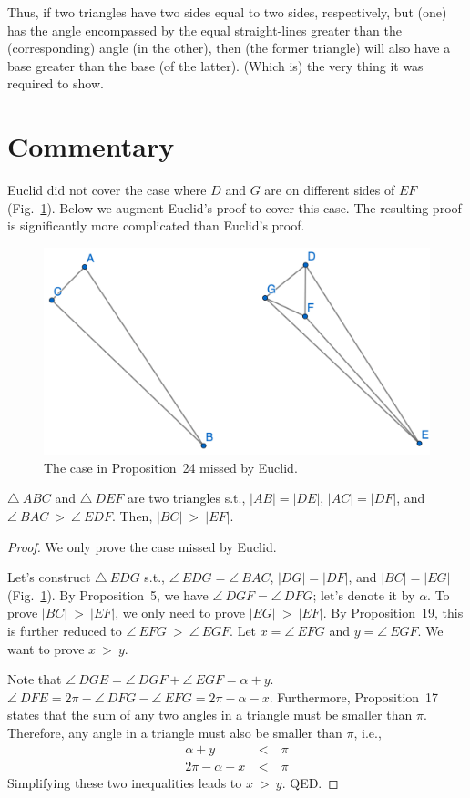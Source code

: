 Thus, if two triangles have two sides equal to two sides, respectively,
but (one) has the angle encompassed by the equal straight-lines greater than the 
(corresponding) angle (in the other), then (the former triangle) will also have a base greater than the base (of the latter).
(Which is) the very thing it was required to show.


\section*{Commentary}

Euclid did not cover the case where $D$ and $G$ are on different sides of $EF$ (Fig.~\ref{fig:prop_24b}). Below we augment Euclid's proof to cover this case. The resulting proof is significantly more complicated than Euclid's proof.

\begin{figure}[ht]
    \begin{center}
    \includegraphics[width=0.35\linewidth]{figures/proposition_24.png}
    \caption{The case in Proposition~24 missed by Euclid.}
    \label{fig:prop_24b}
    \end{center}
\end{figure}


\begin{proposition}\label{proposition_24}\leanok
    $\triangle~ABC$ and $\triangle~DEF$ are two triangles s.t., $|AB|=|DE|$, $|AC|=|DF|$, and $\angle~BAC~>~\angle~EDF$. Then, $|BC|~>~|EF|$.
\end{proposition}
\begin{proof}
    \leanok
    We only prove the case missed by Euclid. 
    
    Let's construct $\triangle~EDG$ s.t., $\angle~EDG = \angle~BAC$, $|DG|=|DF|$, and $|BC|=|EG|$ (Fig.~\ref{fig:prop_24b}). By Proposition~5, we have $\angle~DGF = \angle~DFG$; let's denote it by $\alpha$. To prove $|BC|~>~|EF|$, we only need to prove $|EG|~>~|EF|$. By Proposition~19, this is further reduced to $\angle~EFG~>~\angle~EGF$. Let $x = \angle~EFG$ and $y = \angle~EGF$. We want to prove $x~>~y$.
    
    Note that $\angle~DGE = \angle~DGF + \angle~EGF = \alpha + y$. $\angle~DFE = 2\pi - \angle~DFG - \angle~EFG = 2\pi - \alpha - x$. Furthermore, Proposition~17 states that the sum of any two angles in a triangle must be smaller than $\pi$. Therefore, any angle in a triangle must also be smaller than $\pi$, i.e.,
    \begin{eqnarray*}
        \alpha + y &~<~& \pi \\
        2\pi - \alpha - x &~<~& \pi
    \end{eqnarray*}
    Simplifying these two inequalities leads to $x~>~y$. QED.

\end{proof}
